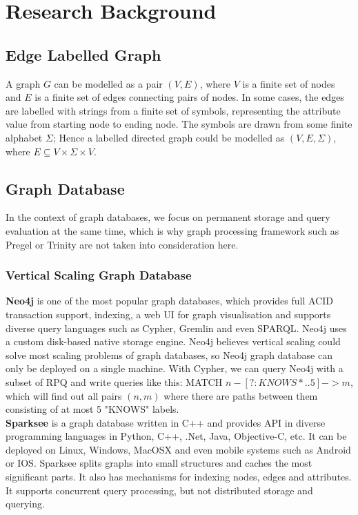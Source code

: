 
\chapter{\label{cha:res-bg}Research Background}

\section{Edge Labelled Graph}
A graph $G$ can be modelled as a pair $(V, E)$, where $V$ is a finite set of nodes and $E$ is a finite set of edges connecting pairs of nodes. In some cases, the edges are labelled with strings from a finite set of symbols, representing the attribute value from starting node to ending node. The symbols are drawn from some finite alphabet $\Sigma$; Hence a labelled directed graph could be modelled as 
$(V,E,\Sigma)$, where $E\subseteq V\times\Sigma\times V$.\\
\section{Graph Database}
In the context of graph databases, we focus on permanent storage and query evaluation at the same time, which is why graph processing framework such as Pregel or Trinity are not taken into consideration here.
\subsection{Vertical Scaling Graph Database}
\textbf{Neo4j}\cite{neo4j} is one of the most popular graph databases, which provides full ACID transaction support, indexing, a web UI for graph visualisation and supports diverse query languages such as Cypher, Gremlin and even SPARQL. Neo4j uses a custom disk-based native storage engine. Neo4j believes vertical scaling could solve most scaling problems of graph databases, so Neo4j graph database can only be deployed on a single machine. With Cypher, we can query Neo4j with a subset of RPQ and write queries like this: MATCH $ n-[?:KNOWS*..5]->m$, which will find out all pairs $(n,m)$ where there are paths between them consisting of at most 5 "KNOWS" labels.\\

\noindent\textbf{Sparksee}\cite{sparksee} is a graph database written in C++ and provides API in diverse programming languages in Python, C++, .Net, Java, Objective-C, etc. It can be deployed on Linux, Windows, MacOSX and even mobile systems such as Android or IOS. Sparksee splits graphs into small structures and caches the most significant parts. It also has mechanisms for indexing nodes, edges and attributes. It supports concurrent query processing, but not distributed storage and querying.

